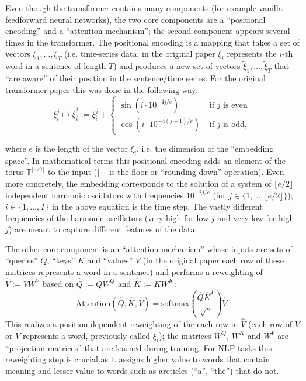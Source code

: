 \documentclass{article}
\begin{document}
Even though the transformer contains many components (for example vanilla feedforward neural networks), the two core components are a ``positional encoding'' and a ``attention mechanism''; the second component appears several times in the transformer.
The positional encoding is a mapping that takes a set of vectors $\xi_1, \ldots, \xi_T$ (i.e. time-series data; in the original paper $\xi_i$ represents the $i$-th word in a sentence of length $T$) and produces a new set of vectors $\tilde{\xi}_1, \ldots, \tilde{\xi}_T$ that ``are aware'' of their position in the sentence/time series.
For the original transformer paper this was done in the following way: 
\begin{equation}
    \xi_i^j \mapsto \tilde{\xi}_i^j := \xi_i^j + \begin{cases} \sin(i\cdot10^{-4j/e}) & \text{ if $j$ is even} \\ \cos(i\cdot10^{-4(j-1)/e}) & \text{ if $j$ is odd}, \end{cases}
    \label{eq:embedding}
\end{equation}

where $e$ is the length of the vector $\xi_i$, i.e. the dimension of the ``embedding space''. 
In mathematical terms this positional encoding adds an element of the torus $\mathbb{T}^{\lfloor{}e/2\rfloor}$ to the input ($\lfloor\cdot\rfloor$ is the floor or ``rounding down'' operation). Even more concretely, the embedding corresponds to the solution of a system of $\lfloor{}e/2\rfloor$ independent harmonic oscillators with frequencies $10^{-2j/e}$ (for $j\in\{1,\ldots,\lfloor{}e/2\rfloor\}$); $i\in\{1,\ldots,T\}$ in the above equation is the time step. The vastly different frequencies of the harmonic oscillators (very high for low $j$ and very low for high $j$) are meant to capture different features of the data. 


The other core component is an ``attention mechanism'' whose inputs are sets of ``queries'' $Q$, ``keys'' $K$ and ``values'' $V$ (in the original paper each row of these matrices represents a word in a sentence) and performs a reweighting of $\hat{V}:= VW^V$ based on $\hat{Q}:=QW^Q$ and $\hat{K}:=KW^K$:
\begin{equation}
    \mathrm{Attention}(\hat{Q},\hat{K},\hat{V}) = \mathrm{softmax}\left(\frac{\hat{Q}\hat{K}^T}{\sqrt{e}}\right)\hat{V}.
    \label{eq:attention}
\end{equation}
This realizes a position-dependent reweighting of the each row in $\hat{V}$ (each row of $V$ or $\hat{V}$ represents a word, previously called $\xi_i$); the matrices $W^Q$, $W^K$ and $W^V$ are ``projection matrices'' that are learned during training. For NLP tasks this reweighting step is crucial as it assigns higher value to words that contain meaning and lesser value to words such as arcticles (``a'', ``the'') that do not. 
\end{document}
